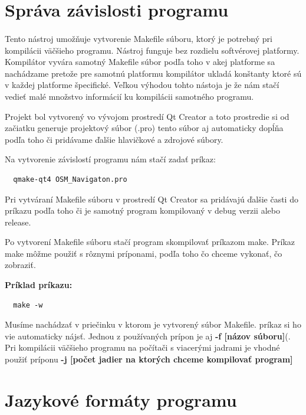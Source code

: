 \section{Správa závislosti programu}
\paragraph{}
Tento nástroj umožňuje vytvorenie Makefile súboru, ktorý je potrebný pri
kompilácii väčšieho programu. Nástroj funguje bez rozdielu softvérovej platformy.
Kompilátor vyvára samotný Makefile súbor podľa toho v akej platforme sa nachádzame pretože pre samotnú platformu kompilátor ukladá konštanty ktoré sú v každej platforme špecifické. Veľkou výhodou tohto nástoja je že nám stačí vedieť malé množstvo informácií ku kompilácii samotného programu.

Projekt bol vytvorený vo vývojom prostredí Qt Creator a toto prostredie si od začiatku generuje projektový súbor (.pro) tento súbor aj automaticky dopĺňa podľa toho či pridávame ďalšie hlavičkové a zdrojové súbory.
\begin{flushleft}
Na vytvorenie závislostí programu nám stačí zadať príkaz:
\begin{verbatim}
  qmake-qt4 OSM_Navigaton.pro
\end{verbatim}
\end{flushleft}

Pri vytváraní Makefile súboru v prostredí Qt Creator sa pridávajú ďalšie časti do príkazu podľa toho či je samotný program kompilovaný v debug verzii alebo release.

Po vytvorení Makefile súboru stačí program skompilovať príkazom make. Príkaz make môžme použiť s rôznymi príponami, podľa toho čo chceme vykonať, čo zobraziť. 
\begin{flushleft}
\textbf{Príklad príkazu:}
\begin{verbatim}
  make -w
\end{verbatim}
\end{flushleft}

Musíme nachádzať v priečinku v ktorom je vytvorený súbor Makefile. príkaz si ho vie automaticky nájsť.
Jednou z používaných prípon je aj \textbf{-f [názov súboru]}(. Pri kompilácii väčšieho programu na počítači s viacerými jadrami je vhodné použiť príponu \textbf{-j [počet jadier na ktorých chceme kompilovať program]}

\section{Jazykové formáty programu}

